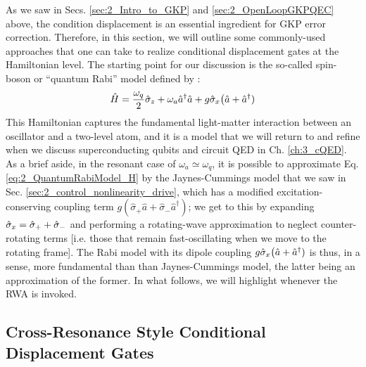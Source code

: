 As we saw in Secs. \ref{sec:2_Intro_to_GKP} and \ref{sec:2_OpenLoopGKPQEC} above, the condition displacement is an essential ingredient for GKP error correction. Therefore, in this section, we will  outline some commonly-used approaches that one can take to realize conditional displacement gates at the Hamiltonian level. The starting point for our discussion is the so-called spin-boson or ``quantum Rabi'' model defined by \cite{hagelstein2004introductory}:
\begin{equation}
\hat{H} = \frac{\omega_q}{2}\hat{\sigma}_z + \omega_a \hat{a}^\dagger \hat{a} + g\hat{\sigma}_x\big(\hat{a} + \hat{a}^\dagger)
\label{eq:2_QuantumRabiModel_H}
\end{equation}
This Hamiltonian captures the fundamental light-matter interaction between an oscillator and a two-level atom, and it is a model that we will return to and refine when we discuss superconducting qubits and circuit QED in Ch. \ref{ch:3_cQED}. As a brief aside, in the resonant case of $\omega_a \simeq \omega_q$, it is possible to approximate Eq. \eqref{eq:2_QuantumRabiModel_H} by the Jaynes-Cummings model that we saw in Sec. \ref{sec:2_control_nonlinearity_drive}, which has a modified excitation-conserving coupling term $g(\hat{\sigma}_+\hat{a} + \hat{\sigma}_-\hat{a}^\dagger)$; we get to this by expanding $\hat{\sigma}_x = \hat{\sigma}_+ + \hat{\sigma}_-$ and performing a rotating-wave approximation to neglect counter-rotating terms [i.e. those that remain fast-oscillating when we move to the rotating frame]. The Rabi model with its dipole coupling $g\hat{\sigma}_x\big(\hat{a} + \hat{a}^\dagger)$ is thus, in a sense, more fundamental than than Jaynes-Cummings model, the latter being an approximation of the former. In what follows, we will highlight whenever the RWA is invoked.

\subsection{Cross-Resonance Style Conditional Displacement Gates}

